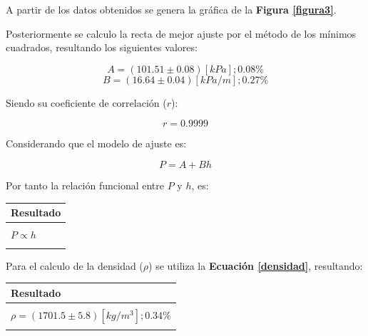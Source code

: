 \documentclass[letter,11pt]{article}
\begin{document}
A partir de los datos obtenidos se genera la gráfica de la
\textbf{Figura \ref{figura3}}.

Posteriormente se calculo la recta de mejor ajuste por el método de los mínimos
cuadrados, resultando los siguientes valores:

\begin{equation*}
    A = (101.51 \pm 0.08) [kPa]; 0.08\%
\end{equation*}
\begin{equation*}
    B = (16.64 \pm 0.04) [kPa/m]; 0.27\%
\end{equation*}
\vspace{0.10cm}

Siendo su coeficiente de correlación ($r$):

\begin{equation*}
    r = 0.9999
\end{equation*}
\vspace{0.10cm}

Considerando que el modelo de ajuste es:

\begin{equation*}
    P = A + B h
\end{equation*}
\vspace{0.10cm}

Por tanto la relación funcional entre $P$ y $h$, es:

\begin{center}
\begin{tabular}{|>{\centering}m{9.2cm}<{\centering}|}
\hline
\textbf{Resultado} 
\tabularnewline \hline
\\
$P \propto h$ \tabularnewline
\\
\hline
\end{tabular}
\end{center}
\vspace{0.10cm}

Para el calculo de la densidad ($\rho$) se utiliza la
\textbf{Ecuación \ref{densidad}}, resultando:

\begin{center}
\begin{tabular}{|>{\centering}m{9.2cm}<{\centering}|}
\hline
\textbf{Resultado} 
\tabularnewline \hline
\\
$\rho = (1701.5 \pm 5.8) [kg/m^3]; 0.34\%$ \tabularnewline
\\
\hline
\end{tabular}
\end{center}
\vspace{0.10cm}
\end{document}
